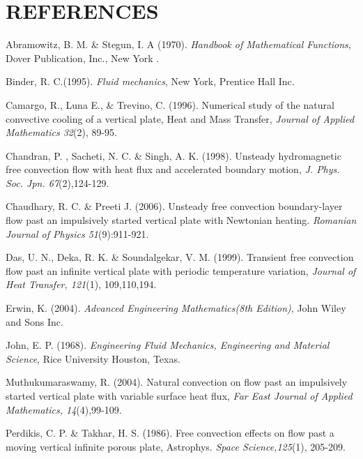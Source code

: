 \documentclass[11pt]{report}
\begin{document}
	\chapter*{REFERENCES}
	\begin{description}
		\item Abramowitz, B. M. \& Stegun, I. A (1970). \emph{Handbook of Mathematical Functions}, Dover Publication, Inc., New York .
		
		\item Binder, R. C.(1995). \emph{Fluid mechanics}, New York, Prentice Hall Inc.
		
		\item Camargo, R., Luna E., \& Trevino, C. (1996). Numerical study of the natural convective cooling of a vertical plate, Heat and Mass Transfer, \emph{Journal of Applied Mathematics 32}(2), 89-95.
		
		
		\item Chandran, P. , Sacheti, N. C. \& Singh, A. K. (1998). Unsteady hydromagnetic free convection flow with heat flux and accelerated boundary motion, \emph{J. Phys. Soc. Jpn. 67}(2),124-129.
		
		
		\item Chaudhary, R. C. \& Preeti J. (2006). Unsteady free convection boundary-layer flow past an impulsively started vertical plate with Newtonian heating. \emph{Romanian Journal of Physics 51}(9):911-921.
		
		
		\item Das, U. N., Deka, R. K. \& Soundalgekar, V. M. (1999). Transient free convection flow past an infinite vertical plate with periodic temperature variation, \emph{Journal of Heat Transfer, 121}(1), 109,110,194.
		
		
		\item Erwin, K. (2004). \emph{Advanced Engineering Mathematics(8th Edition)}, John Wiley and Sons Inc.
		
		
		\item John, E. P. (1968). \emph{Engineering Fluid Mechanics, Engineering and Material Science}, Rice University Houston, Texas.
		
		
		\item Muthukumaraswamy, R. (2004). Natural convection on flow past an impulsively started vertical plate with variable surface heat flux, \emph{Far East Journal of Applied Mathematics, 14}(4),99-109.
			
			
		\item Perdikis, C. P. \& Takhar, H. S. (1986). Free convection effects on flow past a moving vertical infinite porous plate, Astrophys.  \emph{Space Science,125}(1), 205-209.
		

\end{description}
\end{document}
